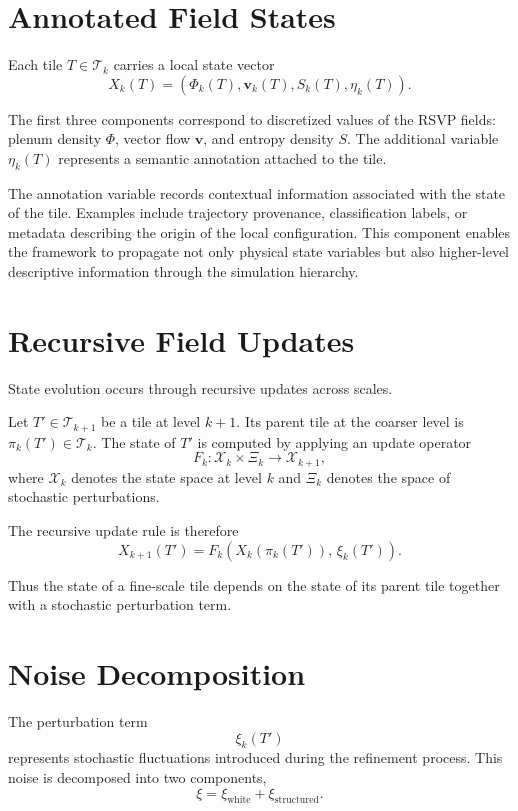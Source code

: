 \documentclass[11pt, openany]{book}
\theoremstyle{plain}
\theoremstyle{definition}
\theoremstyle{remark}
\begin{document}
\section{Annotated Field States}

Each tile $T\in\mathcal{T}_k$ carries a local state vector
\[
X_k(T)
=
(\Phi_k(T),\mathbf{v}_k(T),S_k(T),\eta_k(T)).
\]

The first three components correspond to discretized values of the RSVP
fields: plenum density $\Phi$, vector flow $\mathbf{v}$, and entropy
density $S$.  The additional variable $\eta_k(T)$ represents a semantic
annotation attached to the tile.

The annotation variable records contextual information associated with
the state of the tile.  Examples include trajectory provenance,
classification labels, or metadata describing the origin of the local
configuration.  This component enables the framework to propagate not
only physical state variables but also higher-level descriptive
information through the simulation hierarchy.

\section{Recursive Field Updates}

State evolution occurs through recursive updates across scales.

Let $T'\in\mathcal{T}_{k+1}$ be a tile at level $k+1$.  Its parent tile at
the coarser level is $\pi_k(T')\in\mathcal{T}_k$.  The state of $T'$ is
computed by applying an update operator
\[
F_k
:
\mathcal{X}_k \times \Xi_k
\to
\mathcal{X}_{k+1},
\]
where $\mathcal{X}_k$ denotes the state space at level $k$ and
$\Xi_k$ denotes the space of stochastic perturbations.

The recursive update rule is therefore
\[
X_{k+1}(T')
=
F_k\!\left(
X_k(\pi_k(T')),
\,\xi_k(T')
\right).
\]

Thus the state of a fine-scale tile depends on the state of its parent
tile together with a stochastic perturbation term.

\section{Noise Decomposition}

The perturbation term
\[
\xi_k(T')
\]
represents stochastic fluctuations introduced during the refinement
process.  This noise is decomposed into two components,
\[
\xi
=
\xi_{\text{white}}
+
\xi_{\text{structured}}.
\]
\end{document}
